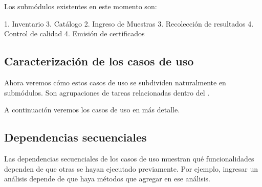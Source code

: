 \documentclass[letterpaper,10pt,spanish]{sphinxmanual}
\begin{document}
Los submódulos existentes en este momento son:

1. Inventario
3. Catálogo
2. Ingreso de Muestras
3. Recolección de resultados
4. Control de calidad
4. Emisión de certificados


\subsection{Caracterización de los casos de uso}
\label{\detokenize{requerimientos/srs:caracterizacion-de-los-casos-de-uso}}
Ahora veremos cómo estos casos de uso se subdividen naturalmente en
submódulos. Son agrupaciones de tareas relacionadas dentro del
.

A continuación veremos los casos de uso en más detalle.








\subsection{Dependencias secuenciales}
\label{\detokenize{requerimientos/srs:dependencias-secuenciales}}
Las dependencias secuenciales de los casos de
uso muestran qué funcionalidades dependen de que otras se hayan
ejecutado previamente. Por ejemplo, ingresar un análisis depende de que
haya métodos que agregar en ese análisis.
\end{document}
